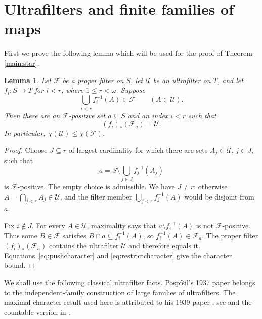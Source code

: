 \documentclass[10pt,a4paper]{amsart}
\newtheorem{lemma}[theorem]{Lemma}
\theoremstyle{definition}
\theoremstyle{remark}
\newcommand{\U}{\mathcal U}
\newcommand{\F}{\mathcal F}
\begin{document}
\section{Ultrafilters and finite families of maps}
First we prove the following lemma which will be used for the proof of Theorem \ref{main:star}.
\begin{lemma}\label{lem:finite}
Let $\F$ be a proper filter on $S$, let $\U$ be an ultrafilter on $T$, and let $f_i:S\to T$ for $i<r$, where $1\leqslant r<\omega$. Suppose
\begin{equation}\label{eq:finiteunion}
\bigcup_{i<r}f_i^{-1}(A)\in\F\qquad(A\in\U).
\end{equation}
Then there are an $\F$-positive set $a\subseteq S$ and an index $i<r$ such that
\[
(f_i)_*(\F_a)=\U.
\]
In particular, $\chi(\U)\leqslant\chi(\F)$.
\end{lemma}
\begin{proof}
Choose $J\subseteq r$ of largest cardinality for which there are sets $A_j\in\U$, $j\in J$, such that
\[
a=S\setminus\bigcup_{j\in J}f_j^{-1}(A_j)
\]
is $\F$-positive. The empty choice is admissible. We have $J\ne r$: otherwise $A=\bigcap_{j<r}A_j\in\U$, and the filter member $\bigcup_{j<r}f_j^{-1}(A)$ would be disjoint from $a$.

Fix $i\notin J$. For every $A\in\U$, maximality says that $a\setminus f_i^{-1}(A)$ is not $\F$-positive. Thus some $B\in\F$ satisfies $B\cap a\subseteq f_i^{-1}(A)$, so $f_i^{-1}(A)\in\F_a$. The proper filter $(f_i)_*(\F_a)$ contains the ultrafilter $\U$ and therefore equals it. Equations~\eqref{eq:pushcharacter} and \eqref{eq:restrictcharacter} give the character bound.
\end{proof}

We shall use the following classical ultrafilter facts. Posp\'i\v{s}il's 1937 paper \cite{Pospisil1937} belongs to the independent-family construction of large families of ultrafilters. The maximal-character result used here is attributed to his 1939 paper \cite{Pospisil1939}; see \cite[Theorem 2.7]{Comfort} and the countable version in \cite{GuzmanHrusak}.
\end{document}
